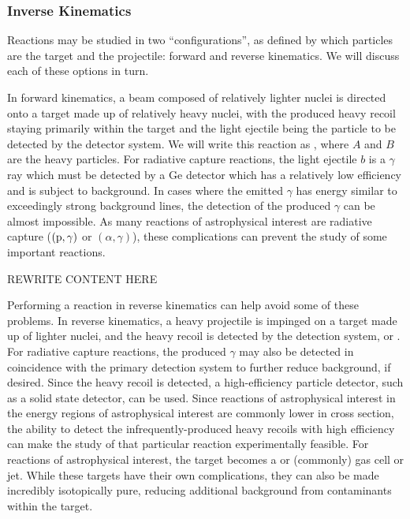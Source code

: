\subsubsection{Inverse Kinematics}
Reactions may be studied in two ``configurations'', as defined by which
particles are the target and the projectile: forward and reverse
kinematics. We will discuss each of these options in turn.

In forward kinematics, a beam composed of relatively lighter nuclei is
directed onto a target made up of relatively heavy nuclei, with the
produced heavy recoil staying primarily within the target and the light
ejectile being the particle to be detected by the detector system. We
will write this reaction as , where $A$ and $B$ are
the heavy particles. For radiative capture reactions, the light ejectile
$b$ is a $\gamma$ ray which must be detected by a Ge detector which has
a relatively low efficiency and is subject to background. In cases where
the emitted $\gamma$ has energy similar to exceedingly strong background
lines, the detection of the produced $\gamma$ can be almost impossible.
As many reactions of astrophysical interest are radiative capture
($(\rm{p},\gamma)$ or $(\alpha,\gamma)$), these complications can
prevent the study of some important reactions.

REWRITE CONTENT HERE

Performing a reaction in reverse kinematics can help avoid some of these
problems. In reverse kinematics, a heavy projectile is impinged on a
target made up of lighter nuclei, and the heavy recoil is detected by
the detection system, or . For radiative capture
reactions, the produced $\gamma$ may also be detected in coincidence
with the primary detection system to further reduce background, if
desired. Since the heavy recoil is detected, a high-efficiency particle
detector, such as a solid state detector, can be used. Since reactions
of astrophysical interest in the energy regions of astrophysical
interest are commonly lower in cross section, the ability to detect the
infrequently-produced heavy recoils with high efficiency can make the
study of that particular reaction experimentally feasible. For reactions
of astrophysical interest, the target becomes a  or
 (commonly) gas cell or jet. While these targets have their
own complications, they can also be made incredibly isotopically pure,
reducing additional background from contaminants within the target.

